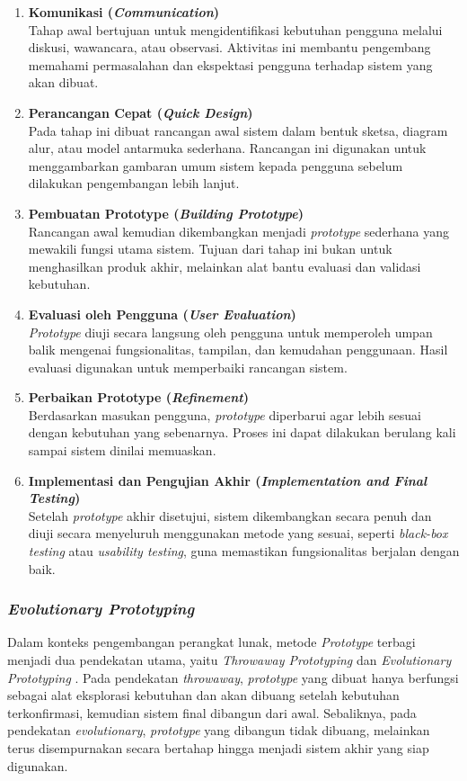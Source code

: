 \begin{enumerate}[noitemsep]
	\item \textbf{Komunikasi (\textit{Communication})}\\
	Tahap awal bertujuan untuk mengidentifikasi kebutuhan pengguna melalui diskusi, wawancara, atau observasi. Aktivitas ini membantu pengembang memahami permasalahan dan ekspektasi pengguna terhadap sistem yang akan dibuat.
	\item \textbf{Perancangan Cepat (\textit{Quick Design})}\\
	Pada tahap ini dibuat rancangan awal sistem dalam bentuk sketsa, diagram alur, atau model antarmuka sederhana. Rancangan ini digunakan untuk menggambarkan gambaran umum sistem kepada pengguna sebelum dilakukan pengembangan lebih lanjut.
	\item \textbf{Pembuatan Prototype (\textit{Building Prototype})}\\
	Rancangan awal kemudian dikembangkan menjadi \textit{prototype} sederhana yang mewakili fungsi utama sistem. Tujuan dari tahap ini bukan untuk menghasilkan produk akhir, melainkan alat bantu evaluasi dan validasi kebutuhan.
	\item \textbf{Evaluasi oleh Pengguna (\textit{User Evaluation})}\\
	\textit{Prototype} diuji secara langsung oleh pengguna untuk memperoleh umpan balik mengenai fungsionalitas, tampilan, dan kemudahan penggunaan. Hasil evaluasi digunakan untuk memperbaiki rancangan sistem.
	\item \textbf{Perbaikan Prototype (\textit{Refinement})}\\
	Berdasarkan masukan pengguna, \textit{prototype} diperbarui agar lebih sesuai dengan kebutuhan yang sebenarnya. Proses ini dapat dilakukan berulang kali sampai sistem dinilai memuaskan.
	\item \textbf{Implementasi dan Pengujian Akhir (\textit{Implementation and Final Testing})}\\
	Setelah \textit{prototype} akhir disetujui, sistem dikembangkan secara penuh dan diuji secara menyeluruh menggunakan metode yang sesuai, seperti \textit{black-box testing} atau \textit{usability testing}, guna memastikan fungsionalitas berjalan dengan baik.
\end{enumerate}

\subsubsection{\textit{Evolutionary Prototyping}} \label{II.EvolutionaryPrototyping}
Dalam konteks pengembangan perangkat lunak, metode \textit{Prototype} terbagi menjadi dua pendekatan utama, yaitu \textit{Throwaway Prototyping} dan \textit{Evolutionary Prototyping} \cite{crinnion1991evolutionary}. Pada pendekatan \textit{throwaway}, \textit{prototype} yang dibuat hanya berfungsi sebagai alat eksplorasi kebutuhan dan akan dibuang setelah kebutuhan terkonfirmasi, kemudian sistem final dibangun dari awal. Sebaliknya, pada pendekatan \textit{evolutionary}, \textit{prototype} yang dibangun tidak dibuang, melainkan terus disempurnakan secara bertahap hingga menjadi sistem akhir yang siap digunakan.\par

